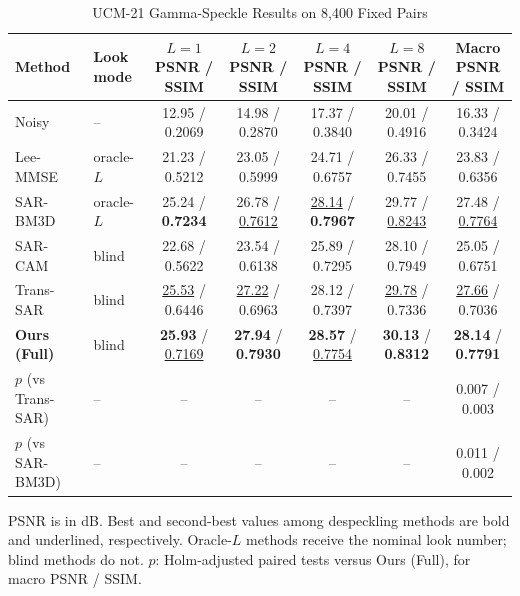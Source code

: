 \documentclass[journal]{IEEEtran}
\newcommand{\rev}[1]{{\color{RevisionBlue}#1}}
\newcommand{\rev}[1]{#1}
\begin{document}
\begin{table}[!b]
\caption{UCM-21 Gamma-Speckle Results on 8,400 Fixed Pairs}
\label{tab:main}
\centering
\footnotesize
\setlength{\tabcolsep}{3.2pt}
\renewcommand{\arraystretch}{1.08}
\begin{tabular*}{0.86\textwidth}{@{\extracolsep{\fill}}llccccc@{}}
\toprule
\textbf{Method} & \textbf{Look mode} &
\shortstack{\(L=1\)\\PSNR / SSIM} &
\shortstack{\(L=2\)\\PSNR / SSIM} &
\shortstack{\(L=4\)\\PSNR / SSIM} &
\shortstack{\(L=8\)\\PSNR / SSIM} &
\shortstack{Macro\\PSNR / SSIM} \\
\midrule
Noisy       & --                & 12.95 / 0.2069 & 14.98 / 0.2870 & 17.37 / 0.3840 & 20.01 / 0.4916 & 16.33 / 0.3424 \\
Lee-MMSE    & oracle-\(L\)      & 21.23 / 0.5212 & 23.05 / 0.5999 & 24.71 / 0.6757 & 26.33 / 0.7455 & 23.83 / 0.6356 \\
SAR-BM3D    & oracle-\(L\)      & 25.24 / \textbf{0.7234} & 26.78 / \underline{0.7612} & \underline{28.14} / \textbf{0.7967} & 29.77 / \underline{0.8243} & 27.48 / \underline{0.7764} \\
SAR-CAM     & blind             & 22.68 / 0.5622 & 23.54 / 0.6138 & 25.89 / 0.7295 & 28.10 / 0.7949 & 25.05 / 0.6751 \\
Trans-SAR   & blind             & \underline{25.53} / 0.6446 & \underline{27.22} / 0.6963 & 28.12 / 0.7397 & \underline{29.78} / 0.7336 & \underline{27.66} / 0.7036 \\
\textbf{Ours (Full)} & blind    & \textbf{25.93} / \underline{0.7169} & \textbf{27.94} / \textbf{0.7930} & \textbf{28.57} / \underline{0.7754} & \textbf{30.13} / \textbf{0.8312} & \textbf{28.14} / \textbf{0.7791} \\
\midrule
\rev{\(p\) (vs Trans-SAR)} & -- & -- & -- & -- & -- & \rev{0.007 / 0.003} \\
\rev{\(p\) (vs SAR-BM3D)} & -- & -- & -- & -- & -- & \rev{0.011 / 0.002} \\
\bottomrule
\end{tabular*}
\vspace{1pt}
\parbox{0.86\textwidth}{\footnotesize PSNR is in dB. Best and second-best values among despeckling methods are bold and underlined, respectively. Oracle-\(L\) methods receive the nominal look number; blind methods do not. \rev{\(p\): Holm-adjusted paired tests versus Ours (Full), for macro PSNR / SSIM.}}
\end{table}
\end{document}
